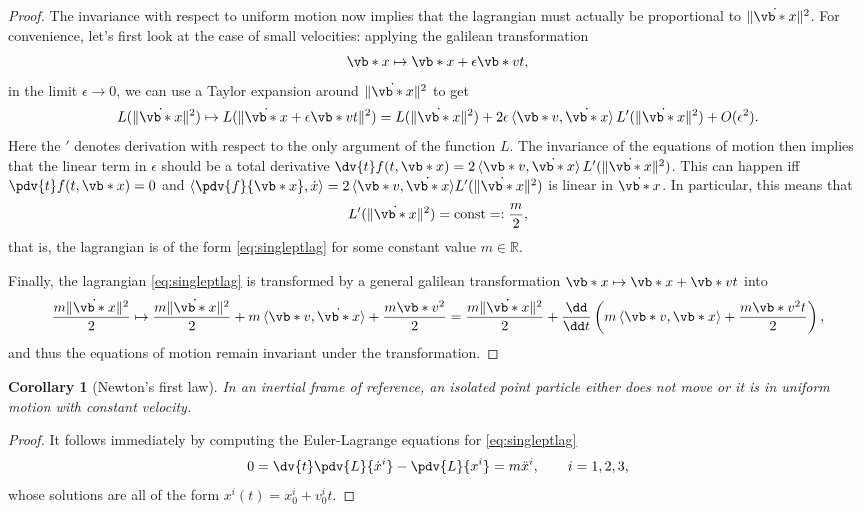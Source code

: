 \documentclass[english,fontsize=11pt,paper=b5]{scrbook}
\newtheorem{corollary}[theorem]{Corollary}
\theoremstyle{definition}
\begin{document}
\begin{proof}
      The invariance with respect to uniform motion now implies that the lagrangian must actually be proportional to $\|\dot{\vb*{x}}\|^2$.
      For convenience, let's first look at the case of small velocities: applying the galilean transformation
      \begin{equation}
        \vb*{x} \mapsto \vb*{x} + \epsilon \vb*{v}t,
      \end{equation}
      in the limit $\epsilon \to 0$, we can use a Taylor expansion around $\|\dot{\vb*{x}}\|^2$ to get
      \begin{equation}
        L(\|\dot{\vb*{x}}\|^2) \mapsto L(\|\dot{\vb*{x}} + \epsilon \vb*{v}t\|^2) = L(\|\dot{\vb*{x}}\|^2) + 2\epsilon\,\langle\vb*{v}, \dot{\vb*{x}}\rangle\,L'(\|\dot{\vb*{x}}\|^2) + O(\epsilon^2).
      \end{equation}
      Here the $'$ denotes derivation with respect to the only argument of the function $L$.
      The invariance of the equations of motion then implies that the linear term in $\epsilon$ should be a total derivative $\dv{t} f(t, \vb*{x}) = 2\,\langle\vb*{v}, \dot{\vb*{x}}\rangle\,L'(\|\dot{\vb*{x}}\|^2)$.
      This can happen iff $\pdv{t} f(t, \vb*{x}) = 0$ and $\langle \pdv{f}{\vb*{x}}, \dot x\rangle  = 2\,\langle\vb*{v}, \dot{\vb*{x}}\rangle L'(\|\dot{\vb*{x}}\|^2)$ is linear in $\dot{\vb*{x}}$.
      In particular, this means that
      \begin{equation}
        L'(\|\dot{\vb*{x}}\|^2) = \mathrm{const} =: \frac{m}2,
      \end{equation}
      that is, the lagrangian is of the form \eqref{eq:singleptlag} for some constant value $m\in\mathbb{R}$.

      Finally, the lagrangian \eqref{eq:singleptlag} is transformed by a general galilean transformation $\vb*{x} \mapsto \vb*{x} + \vb*{v}t$ into
      \begin{equation}
        \frac{m \|\dot{\vb*{x}}\|^2}2 \mapsto
        \frac{m \|\dot{\vb*{x}}\|^2}2 + m\,\langle\vb*{v},\dot{\vb*{x}}\rangle + \frac{m \vb*{v}^2}2
        = \frac{m \|\dot{\vb*{x}}\|^2}2 + \frac{\dd }{\dd t}\left(m\,\langle\vb*{v},\vb*{x}\rangle + \frac{m \vb*{v}^2 t}2\right),
      \end{equation}
      and thus the equations of motion remain invariant under the transformation.
    \end{proof}

    \begin{corollary}[Newton's first law]
      In an inertial frame of reference, an isolated point particle either does not move or it is in uniform motion with constant velocity.
    \end{corollary}
    \begin{proof}
      It follows immediately by computing the Euler-Lagrange equations for \eqref{eq:singleptlag}
      \begin{equation}
        0 = \dv{t} \pdv{L}{\dot x^i} - \pdv{L}{x^i} = m \ddot x^i, \qquad i=1,2,3,
      \end{equation}
      whose solutions are all of the form $x^i(t) = x^i_0 + v^i_0 t$.
    \end{proof}
\end{document}
